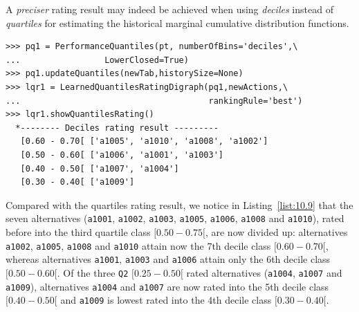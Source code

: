 A \emph{preciser} rating result may indeed be achieved when using \emph{deciles} instead of \emph{quartiles} for estimating the historical marginal cumulative distribution functions.
\begin{lstlisting}[caption={Absolute deciles rating result},label=list:10.9]
>>> pq1 = PerformanceQuantiles(pt, numberOfBins='deciles',\
...                 LowerClosed=True)
>>> pq1.updateQuantiles(newTab,historySize=None)
>>> lqr1 = LearnedQuantilesRatingDigraph(pq1,newActions,\
...                                      rankingRule='best')
>>> lqr1.showQuantilesRating()
  *-------- Deciles rating result ---------
   [0.60 - 0.70[ ['a1005', 'a1010', 'a1008', 'a1002']
   [0.50 - 0.60[ ['a1006', 'a1001', 'a1003']
   [0.40 - 0.50[ ['a1007', 'a1004']
   [0.30 - 0.40[ ['a1009']
\end{lstlisting}

Compared with the quartiles rating result, we notice in Listing~\vref{list:10.9} that the seven alternatives (\texttt{a1001}, \texttt{a1002}, \texttt{a1003}, \texttt{a1005}, \texttt{a1006}, \texttt{a1008} and \texttt{a1010}), rated before into the third quartile class $[0.50-0.75[$, are now divided up: alternatives \texttt{a1002}, \texttt{a1005}, \texttt{a1008} and \texttt{a1010} attain now the 7th decile class $[0.60-0.70[$, whereas alternatives \texttt{a1001}, \texttt{a1003} and \texttt{a1006} attain only the 6th decile class $[0.50-0.60[$. Of the three \texttt{Q2} $[0.25-0.50[$ rated alternatives (\texttt{a1004}, \texttt{a1007} and \texttt{a1009}), alternatives \texttt{a1004} and \texttt{a1007} are now rated into the 5th decile class $[0.40-0.50[$ and \texttt{a1009} is lowest rated into the 4th decile class $[0.30-0.40[$.

